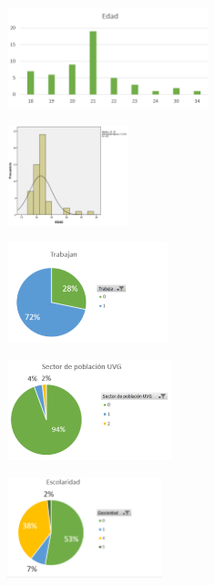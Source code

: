 \begin{center}
\includegraphics[height=1.15in]{figuras/Imagen13.png}
\end{center}

\begin{center}
\includegraphics[height=1.15in]{figuras/Imagen14.png}
\end{center}

\begin{center}
\includegraphics[height=1.15in]{figuras/Imagen15.png}
\end{center}

\begin{center}
\includegraphics[height=1.15in]{figuras/Imagen16.png}
\end{center}

\begin{center}
\includegraphics[height=1.15in]{figuras/Imagen17.png}
\end{center}

